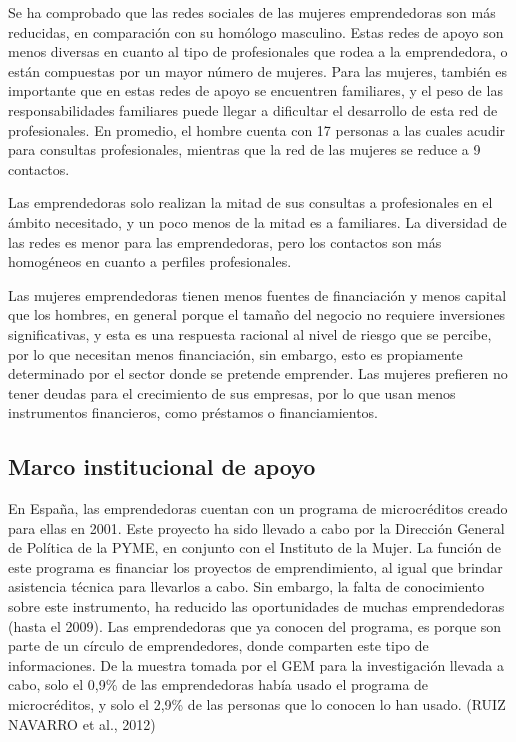 \documentclass[
  letterpaper,
  DIV=11,
  numbers=noendperiod]{scrreprt}
\begin{document}
Se ha comprobado que las redes sociales de las mujeres emprendedoras son
más reducidas, en comparación con su homólogo masculino. Estas redes de
apoyo son menos diversas en cuanto al tipo de profesionales que rodea a
la emprendedora, o están compuestas por un mayor número de mujeres. Para
las mujeres, también es importante que en estas redes de apoyo se
encuentren familiares, y el peso de las responsabilidades familiares
puede llegar a dificultar el desarrollo de esta red de profesionales. En
promedio, el hombre cuenta con 17 personas a las cuales acudir para
consultas profesionales, mientras que la red de las mujeres se reduce a
9 contactos.

Las emprendedoras solo realizan la mitad de sus consultas a
profesionales en el ámbito necesitado, y un poco menos de la mitad es a
familiares. La diversidad de las redes es menor para las emprendedoras,
pero los contactos son más homogéneos en cuanto a perfiles
profesionales.

Las mujeres emprendedoras tienen menos fuentes de financiación y menos
capital que los hombres, en general porque el tamaño del negocio no
requiere inversiones significativas, y esta es una respuesta racional al
nivel de riesgo que se percibe, por lo que necesitan menos financiación,
sin embargo, esto es propiamente determinado por el sector donde se
pretende emprender. Las mujeres prefieren no tener deudas para el
crecimiento de sus empresas, por lo que usan menos instrumentos
financieros, como préstamos o financiamientos.

\hypertarget{marco-institucional-de-apoyo}{%
\subsection{Marco institucional de
apoyo}\label{marco-institucional-de-apoyo}}

En España, las emprendedoras cuentan con un programa de microcréditos
creado para ellas en 2001. Este proyecto ha sido llevado a cabo por la
Dirección General de Política de la PYME, en conjunto con el Instituto
de la Mujer. La función de este programa es financiar los proyectos de
emprendimiento, al igual que brindar asistencia técnica para llevarlos a
cabo. Sin embargo, la falta de conocimiento sobre este instrumento, ha
reducido las oportunidades de muchas emprendedoras (hasta el 2009). Las
emprendedoras que ya conocen del programa, es porque son parte de un
círculo de emprendedores, donde comparten este tipo de informaciones. De
la muestra tomada por el GEM para la investigación llevada a cabo, solo
el 0,9\% de las emprendedoras había usado el programa de microcréditos,
y solo el 2,9\% de las personas que lo conocen lo han usado. (RUIZ
NAVARRO et al., 2012)
\end{document}
